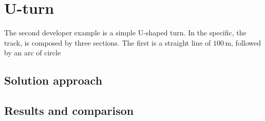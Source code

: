\section{U-turn}
%
The second developer example is a simple U-shaped turn. In the specific, the track, is composed by three sections. The first is a straight line of $100\,\si{\metre}$, followed by an arc of circle

\subsection{Solution approach}
%
\subsection{Results and comparison}
%

\begin{figure}[ht!]
    \centering
    \caption{}
    \label{fig:U-Shape}
\end{figure}
%